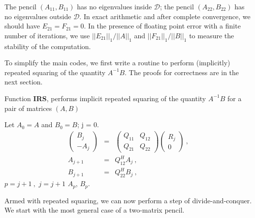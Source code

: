\documentclass{article}
\theoremstyle{definition}
\begin{document}
The pencil $(A_{11}, B_{11})$ has no eigenvalues inside $\mathcal{D}$; 
the pencil $(A_{22}, B_{22})$ has no eigenvalues outside $\mathcal{D}$. 
In exact arithmetic and after complete convergence, we should have 
$E_{21} = F_{21} = 0$. In the presence of floating point error with a finite number of iterations, we use $||E_{21}||_1/||A||_1$ and $||F_{21}||_1/||B||_1$ to measure the stability of the computation. 

To simplify the main codes, we first write a routine to perform (implicitly) repeated squaring of the quantity $A^{-1}B$. The proofs for correctness are in the next section.

\begin{algorithm}[ht!]
\protect\caption{Function \textbf{IRS}, performs implicit repeated squaring of the quantity $A^{-1}B$ for a pair of matrices $(A,B)$}
\begin{algorithmic}[1]
\label{rsq}
\STATE Let $A_0 = A$ and $B_0 = B$; j = 0.
\REPEAT 
\STATE \begin{eqnarray*} \left ( \begin{array}{c} B_j \\ - A_j \end{array} \right ) & = & \left ( \begin{array}{cc} Q_{11} & Q_{12} \\ Q_{21} & Q_{22} \end{array} \right ) \left ( \begin{array}{c} R_j \\ 0 \end{array} \right )~, \\
A_{j+1} & = & Q^H_{12} A_j~, \\
B_{j+1} & = &  Q^H_{22} B_j~, \end{eqnarray*}
\STATE $ p = j+1~,$ 
\ELSE  
\STATE $j = j+1$
\ENDIF
{}
\RETURN $A_p$, $B_p$.
\end{algorithmic}
\end{algorithm}

Armed with repeated squaring, we can now perform a step of divide-and-conquer. We start with the most general case of a two-matrix pencil.
\end{document}

